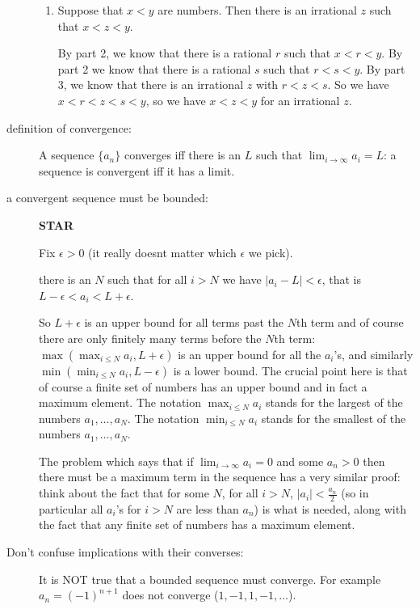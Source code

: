 \documentclass[12pt]{article}
\begin{document}
\begin{description}
\begin{enumerate}
\item  Suppose that $x<y$ are numbers.  Then there is an irrational $z$ such that $x<z<y$.

By part 2, we know that there is a rational $r$ such that $x<r<y$.  By part 2 we know that there is a rational $s$ such that $r<s<y$.  By part 3, we know that there is an irrational $z$ with $r<z<s$.
So we have $x<r<z<s<y$, so we have $x<z<y$ for an irrational $z$.



\end{enumerate}

\item[definition of convergence:]  
A sequence $\{a_n\}$ converges iff there is an $L$ such that $\lim_{i \rightarrow \infty}a_i = L$:  a sequence is convergent iff it has a limit.

\item[a convergent sequence must be bounded:]  {\bf STAR}

Fix $\epsilon>0$ (it really doesnt matter which $\epsilon$ we pick).

there is an $N$ such that for all $i>N$ we have $|a_i-L|<\epsilon$, that is $L-\epsilon<a_i<L+\epsilon$.

So $L+\epsilon$ is an upper bound for all terms past the $N$th term and of course there are only finitely many terms before the $N$th term:  $\max(\max_{i \leq N}a_i,L+\epsilon)$ is an upper bound for all the $a_i$'s,
and similarly $\min(\min_{i \leq N}a_i,L-\epsilon)$ is a lower bound.  The crucial point here is that of course a finite set of numbers has an upper bound and in fact a maximum element.  The notation $\max_{i \leq N}a_i$ stands for the largest of the numbers $a_1, \ldots, a_N$.   The notation $\min_{i \leq N}a_i$ stands for the smallest of the numbers $a_1, \ldots, a_N$.

The problem which says that if $\lim_{i \rightarrow \infty}a_i = 0$ and some $a_n>0$ then there must be a maximum term in the sequence has a very similar proof:  think about the fact that for some $N$,
for all $i>N$, $|a_i|<\frac{a_n}2$ (so in particular all $a_i$'s for $i>N$ are less than $a_n$) is what is needed, along with the fact that any finite set of numbers has a maximum element.

\item[Don't confuse implications with their converses:]

It is NOT true that a bounded sequence must converge.  For example $a_n = (-1)^{n+1}$ does not converge ($1,-1,1,-1,\ldots$).


\end{description}
\end{document}
